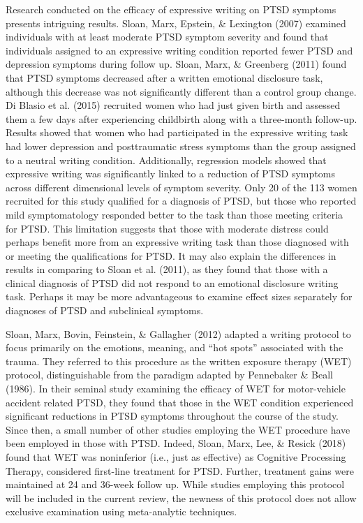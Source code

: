 \documentclass[man]{apa6}
\theoremstyle{definition}
\theoremstyle{definition}
\theoremstyle{definition}
\theoremstyle{remark}
\begin{document}
Research conducted on the efficacy of expressive writing on PTSD
symptoms presents intriguing results. Sloan, Marx, Epstein, \& Lexington
(2007) examined individuals with at least moderate PTSD symptom severity
and found that individuals assigned to an expressive writing condition
reported fewer PTSD and depression symptoms during follow up. Sloan,
Marx, \& Greenberg (2011) found that PTSD symptoms decreased after a
written emotional disclosure task, although this decrease was not
significantly different than a control group change. Di Blasio et al.
(2015) recruited women who had just given birth and assessed them a few
days after experiencing childbirth along with a three-month follow-up.
Results showed that women who had participated in the expressive writing
task had lower depression and posttraumatic stress symptoms than the
group assigned to a neutral writing condition. Additionally, regression
models showed that expressive writing was significantly linked to a
reduction of PTSD symptoms across different dimensional levels of
symptom severity. Only 20 of the 113 women recruited for this study
qualified for a diagnosis of PTSD, but those who reported mild
symptomatology responded better to the task than those meeting criteria
for PTSD. This limitation suggests that those with moderate distress
could perhaps benefit more from an expressive writing task than those
diagnosed with or meeting the qualifications for PTSD. It may also
explain the differences in results in comparing to Sloan et al. (2011),
as they found that those with a clinical diagnosis of PTSD did not
respond to an emotional disclosure writing task. Perhaps it may be more
advantageous to examine effect sizes separately for diagnoses of PTSD
and subclinical symptoms.

Sloan, Marx, Bovin, Feinstein, \& Gallagher (2012) adapted a writing
protocol to focus primarily on the emotions, meaning, and \enquote{hot
spots} associated with the trauma. They referred to this procedure as
the written exposure therapy (WET) protocol, distinguishable from the
paradigm adapted by Pennebaker \& Beall (1986). In their seminal study
examining the efficacy of WET for motor-vehicle accident related PTSD,
they found that those in the WET condition experienced significant
reductions in PTSD symptoms throughout the course of the study. Since
then, a small number of other studies employing the WET procedure have
been employed in those with PTSD. Indeed, Sloan, Marx, Lee, \& Resick
(2018) found that WET was noninferior (i.e., just as effective) as
Cognitive Processing Therapy, considered first-line treatment for PTSD.
Further, treatment gains were maintained at 24 and 36-week follow up.
While studies employing this protocol will be included in the current
review, the newness of this protocol does not allow exclusive
examination using meta-analytic techniques.
\end{document}
